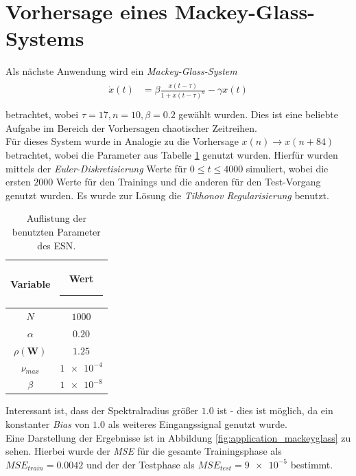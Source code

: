\section{Vorhersage eines Mackey-Glass-Systems}
Als nächste Anwendung wird ein \textit{Mackey-Glass-System}
\begin{align}
\label{eq:application_roessler_pde}
\begin{split}
\dot{x}(t) &= \beta \frac{x(t-\tau)}{1+x(t-\tau)^n}-\gamma x(t)\\
\end{split}
\end{align}
betrachtet, wobei $\tau = 17, n=10, \beta = 0.2$ gewählt wurden. Dies ist eine beliebte Aufgabe im Bereich der Vorhersagen chaotischer Zeitreihen.\\
Für dieses System wurde in Analogie zu  \citep{caraballo2014} die Vorhersage $x(n) \rightarrow x(n+84)$ betrachtet, wobei die Parameter aus Tabelle \ref{tab:application_mackeyglass} genutzt wurden. Hierfür wurden mittels der \textit{Euler-Diskretisierung} Werte für $0 \leq t \leq 4000$ simuliert, wobei die ersten $2000$ Werte für den Trainings und die anderen für den Test-Vorgang genutzt wurden. Es wurde zur Lösung die \textit{Tikhonov Regularisierung} benutzt.

\begin{table}[H]
	\centering
		\begin{tabular}{|c|c|}
		\rule[-1ex]{0pt}{3.5ex} Variable & \hspace{4ex} Wert \rule[-1ex]{4ex}{0pt}\\ 
		\hline \hline 
		\rule[-1ex]{0pt}{3.5ex} $N$ & $1000$ \\ 
		\hline 
		\rule[-1ex]{0pt}{3.5ex} $\alpha$ & $0.20$ \\ 
		\hline 
		\rule[-1ex]{0pt}{3.5ex} $\rho(\mathbf{W})$ & $1.25$ \\ 
		\hline 
		\rule[-1ex]{0pt}{3.5ex} $\nu_{max}$ & $\num{1e-4}$ \\ 
		\hline 
		\rule[-1ex]{0pt}{3.5ex} $\beta$ & $\num{1e-8}$ \\ 
		\hline 
	\end{tabular} 
	\caption{Auflistung der benutzten Parameter des \textsc{ESN}.}
\label{tab:application_mackeyglass}
\end{table}

Interessant ist, dass der Spektralradius größer $1.0$ ist - dies ist möglich, da ein konstanter \textit{Bias} von $1.0$ als weiteres Eingangssignal genutzt wurde.\\
Eine Darstellung der Ergebnisse ist in Abbildung \ref{fig:application_mackeyglass} zu sehen. Hierbei wurde der \textit{MSE} für die gesamte Trainingsphase als $MSE_{train} = 0.0042$ und der der Testphase als $MSE_{test} = \num{9e-5}$ bestimmt.

